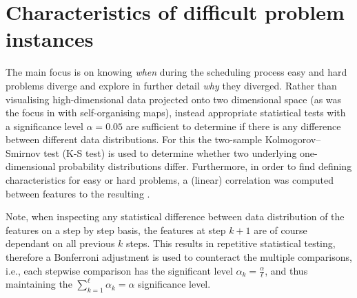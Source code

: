 \section{Characteristics of difficult problem instances}

The main focus is on knowing \emph{when} during the scheduling process easy and hard problems diverge and explore in further detail \emph{why} they diverged. Rather than visualising high-dimensional data projected onto two dimensional space (as was the focus in \cite{SmithMilesLion5} with self-organising maps), instead appropriate statistical tests with a significance level $\alpha=0.05$ are sufficient to determine if there is any difference between different data distributions. For this the two-sample Kolmogorov–Smirnov test (K-S test) is used to determine whether two underlying one-dimensional probability distributions differ. 
Furthermore, in order to find defining characteristics for easy or hard problems, a (linear) correlation was computed between features to the resulting \namerho.

Note, when inspecting any statistical difference between data distribution of the features on a step by step basis, the features at step $k+1$ are of course dependant on all previous $k$ steps. This results in repetitive statistical testing, therefore a Bonferroni adjustment is used to counteract the multiple comparisons, i.e., each stepwise comparison has the significant level $\alpha_k=\frac{\alpha}{\ell}$, and thus maintaining the $\sum_{k=1}^{\ell}\alpha_k=\alpha$ significance level.

